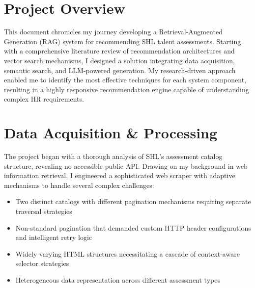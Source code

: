 \documentclass[10pt,a4paper,twocolumn]{article}
\begin{document}

\section*{Project Overview}
\small
This document chronicles my journey developing a Retrieval-Augmented Generation (RAG) system for recommending SHL talent assessments. Starting with a comprehensive literature review of recommendation architectures and vector search mechanisms, I designed a solution integrating data acquisition, semantic search, and LLM-powered generation. My research-driven approach enabled me to identify the most effective techniques for each system component, resulting in a highly responsive recommendation engine capable of understanding complex HR requirements.

\section{Data Acquisition \& Processing}
\small
The project began with a thorough analysis of SHL's assessment catalog structure, revealing no accessible public API. Drawing on my background in web information retrieval, I engineered a sophisticated web scraper with adaptive mechanisms to handle several complex challenges:

\begin{itemize}[leftmargin=*,itemsep=2pt,topsep=0pt,parsep=0pt]
    \item Two distinct catalogs with different pagination mechanisms requiring separate traversal strategies
    \item Non-standard pagination that demanded custom HTTP header configurations and intelligent retry logic
    \item Widely varying HTML structures necessitating a cascade of context-aware selector strategies
    \item Heterogeneous data representation across different assessment types
\end{itemize}
\end{document}
